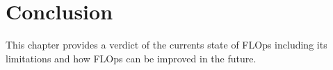 \chapter{Conclusion}\label{chapter:conclusion}

This chapter provides a verdict of the currents state of FLOps including its limitations and how FLOps can be improved in the future.

